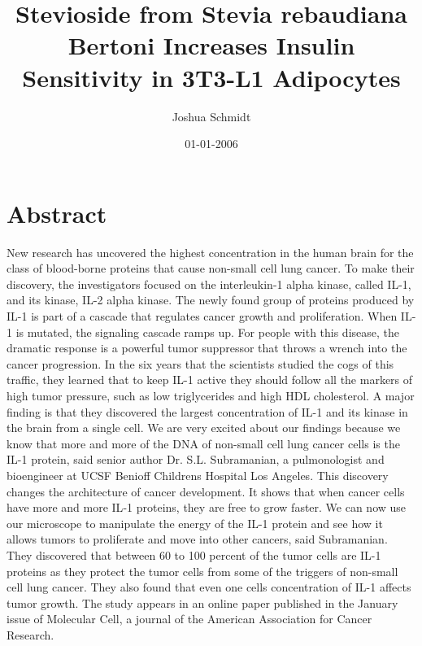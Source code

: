 \documentclass{article}%
\title{Stevioside from Stevia rebaudiana Bertoni Increases Insulin Sensitivity in 3T3{-}L1 Adipocytes}%
\author{Joshua Schmidt}%
\affil{Program on Emerging Infectious Diseases, DUKE{-}NUS Graduate Medical School, Singapore}%
\date{01{-}01{-}2006}%
\begin{document}
%
\normalsize%
\maketitle%
\section{Abstract}%
\label{sec:Abstract}%
New research has uncovered the highest concentration in the human brain for the class of blood{-}borne proteins that cause non{-}small cell lung cancer.\newline%
To make their discovery, the investigators focused on the interleukin{-}1 alpha kinase, called IL{-}1, and its kinase, IL{-}2 alpha kinase.\newline%
The newly found group of proteins produced by IL{-}1 is part of a cascade that regulates cancer growth and proliferation. When IL{-}1 is mutated, the signaling cascade ramps up. For people with this disease, the dramatic response is a powerful tumor suppressor that throws a wrench into the cancer progression.\newline%
In the six years that the scientists studied the cogs of this traffic, they learned that to keep IL{-}1 active they should follow all the markers of high tumor pressure, such as low triglycerides and high HDL cholesterol.\newline%
A major finding is that they discovered the largest concentration of IL{-}1 and its kinase in the brain from a single cell.\newline%
We are very excited about our findings because we know that more and more of the DNA of non{-}small cell lung cancer cells is the IL{-}1 protein, said senior author Dr. S.L. Subramanian, a pulmonologist and bioengineer at UCSF Benioff Childrens Hospital Los Angeles.\newline%
This discovery changes the architecture of cancer development. It shows that when cancer cells have more and more IL{-}1 proteins, they are free to grow faster. We can now use our microscope to manipulate the energy of the IL{-}1 protein and see how it allows tumors to proliferate and move into other cancers, said Subramanian.\newline%
They discovered that between 60 to 100 percent of the tumor cells are IL{-}1 proteins as they protect the tumor cells from some of the triggers of non{-}small cell lung cancer. They also found that even one cells concentration of IL{-}1 affects tumor growth.\newline%
The study appears in an online paper published in the January issue of Molecular Cell, a journal of the American Association for Cancer Research.
\end{document}
